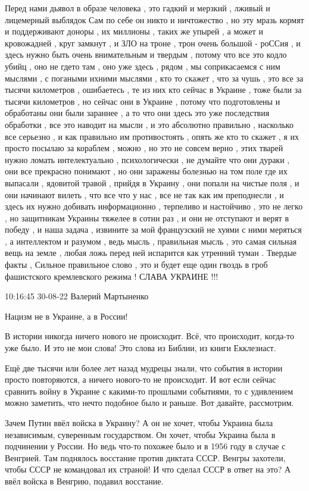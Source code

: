 Перед нами дьявол в образе человека , это гадкий и мерзкий , лживый и
лицемерный выблядок Сам по себе он никто и ничтожество , но эту мразь кормят и
поддерживают доноры , их миллионы , таких же упырей , а может и кровожадней ,
круг замкнут , и ЗЛО на троне , трон очень большой - роССия , и здесь нужно
быть очень внимательным и твердым , потому что все это кодло убийц , оно не
гдето там , оно уже здесь , рядом , мы соприкасаемся с ним мыслями , с погаными
ихними мыслями , кто то скажет , что за чушь , это все за тысячи километров ,
ошибаетесь , те из них кто сейчас в Украине , тоже были за тысячи километров ,
но сейчас они в Украине , потому что подготовлены и обработаны они были
зараннее , а то что они здесь это уже последствия обработки , все это наводит
на мысли , и это абсолютно правильно , насколько все серьезно , и как правильно
им противостоять , опять же кто то скажет , я их просто посылаю за кораблем ,
можно , но это не совсем верно , этих тварей нужно ломать интелектуально ,
психологически , не думайте что они дураки , они все прекрасно понимают , но
они заражены болезнью на том поле где их выпасали , ядовитой травой , прийдя в
Украину , они попали на чистые поля , и они начинают вилеть , что все что у нас
, все не так как им преподнесли , и здесь их нужно добивать информационно ,
терпеливо и настойчиво , это не легко , но защитникам Украины тяжелее в сотни
раз , и они не отступают и верят в победу , и наша задача , извините за мой
французский не хуями с ними меряться , а интеллектом и разумом , ведь мысль ,
правильная мысль , это самая сильная вещь на земле , любая ложь перед ней
испарится как утренний туман . Твердые факты , Сильное правильное слово , это и
будет еще один гвоздь в гроб фашистского кремлевского режима ! СЛАВА УКРАИНЕ
!!!


10:16:45 30-08-22
Валерий Мартыненко

Нацизм не в Украине, а в России!

В истории никогда ничего нового не происходит. Всё, что происходит, когда-то уже было. И это не мои слова! Это слова из Библии, из книги Екклезиаст.

Ещё
две тысячи или более лет назад мудрецы знали, что события в истории
просто повторяются, а ничего нового-то не происходит. И вот если сейчас
сравнить войну в Украине с какими-то прошлыми событиями, то с удивлением
можно заметить, что нечто подобное было и раньше. Вот давайте,
рассмотрим.

Зачем
Путин ввёл войска в Украину? А он не хочет, чтобы Украина была
независимым, суверенным государством. Он хочет, чтобы Украина была в
подчинении у России. Но ведь что-то похожее было и в 1956 году в случае с
Венгрией. Там поднялось восстание против диктата СССР. Венгры захотели,
чтобы СССР не командовал их страной! И что сделал СССР в ответ на это? А
ввёл войска в Венгрию, подавил восстание.

